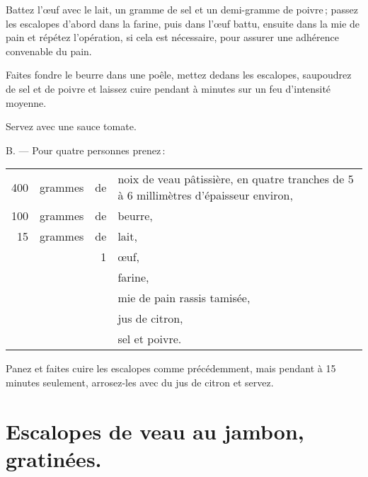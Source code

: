 Battez l'œuf avec le lait, un gramme de sel et un demi-gramme de poivre ;
passez les escalopes d'abord dans la farine, puis dans l'œuf battu, ensuite
dans la mie de pain et répétez l'opération, si cela est nécessaire, pour
assurer une adhérence convenable du pain.

Faites fondre le beurre dans une poêle, mettez dedans les escalopes, saupoudrez
de sel et de poivre et laissez cuire pendant {\mmm} à {\mmm} minutes sur un feu
d'intensité moyenne.

Servez avec une sauce tomate.

\medskip

B. — Pour quatre personnes prenez :

\medskip

\footnotesize
\begin{longtable}{rrrp{16em}}
    400 & grammes & de & noix de veau pâtissière, en quatre tranches de
                         5 à 6 millimètres d'épaisseur environ,                                           \\
    100 & grammes & de & beurre,                                                                          \\
     15 & grammes & de & lait,                                                                            \\
        &         &  1 & œuf,                                                                             \\
        &         &    & farine,                                                                          \\
        &         &    & mie de pain rassis tamisée,                                                      \\
        &         &    & jus de citron,                                                                   \\
        &         &    & sel et poivre.                                                                   \\
\end{longtable}
\normalsize

Panez et faites cuire les escalopes comme précédemment, mais pendant {\mmm} à 15
minutes seulement, arrosez-les avec du jus de citron et servez.

\section*{\centering Escalopes de veau au jambon, gratinées.}
{}

